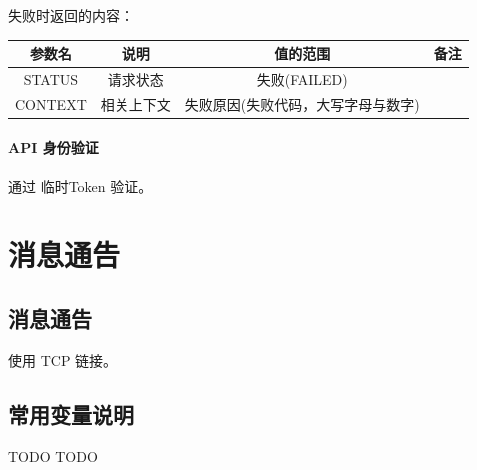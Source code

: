 \documentclass[UTF8]{article}
\def\apiauth{\paragraph{\colorbox[rgb]{0.45,0.9,1}{API 身份验证}}} %
\def\失败{\colorbox[rgb]{1,0.5,0.5}{失败}}
\def\失败V{失败(FAILED)}
\def\失败原因{失败原因(失败代码，大写字母与数字)}
\begin{document}
    \par \失败 时返回的内容：\\
    \begin{tabular}{|c|c|c|c|}
        \hline \rule[-2ex]{0pt}{5.5ex} 参数名 & 说明 & 值的范围 & 备注 \\
        \hline \rule[-2ex]{0pt}{5.5ex} STATUS & 请求状态 & \失败V &  \\ 
        \hline \rule[-2ex]{0pt}{5.5ex} CONTEXT & 相关上下文 & \失败原因 &  \\
        \hline 
    \end{tabular}
    \apiauth
    通过 临时Token 验证。
    \section{消息通告}
    \subsection{消息通告}
    使用 TCP 链接。
    \newpage
    \begin{appendices}
        \section{常用变量说明}
        TODO TODO
    \end{appendices}
    
\end{document}
